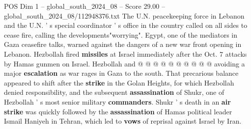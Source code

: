 \begin{textsample}{POS Dim 1 – global\_south\_2024\_08 – Score 29.00 – global\_south\_2024\_08/112948376.txt}
The U.N. peacekeeping force in Lebanon and the U.N. ' s special coordinator ' s office in the country called on all sides to cease fire, calling the developments"worrying".
Egypt, one of the mediators in Gaza ceasefire talks, warned against the dangers of a new war front opening in Lebanon.
Hezbollah fired \textbf{missiles} at Israel immediately after the Oct. 7 attacks by Hamas gunmen on Israel.
Hezbollah and @ @ @ @ @ @ @ @ @ @ avoiding a major \textbf{escalation} as war rages in Gaza to the south.
That precarious balance appeared to shift after the \textbf{strike} in the Golan Heights, for which Hezbollah denied responsibility, and the subsequent \textbf{assassination} of Shukr, one of Hezbollah ' s most senior military \textbf{commanders}.
Shukr ' s death in an \textbf{air} \textbf{strike} was quickly followed by the \textbf{assassination} of Hamas political leader Ismail Haniyeh in Tehran, which led to \textbf{vows} of reprisal against Israel by Iran.

\end{textsample}
